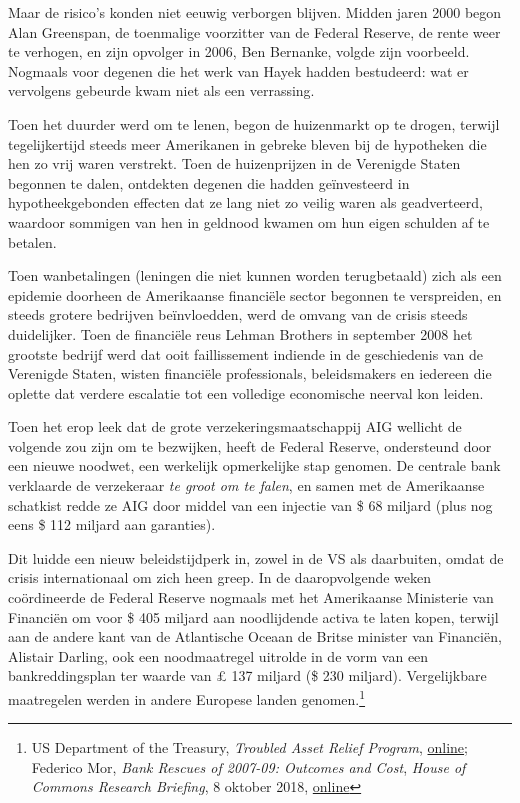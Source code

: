 \documentclass[
  a5paper,
  smalldemyvopaper,11pt,twoside,onecolumn,openright,extrafontsizes,
hidelinks]{memoir}
\begin{document}
Maar de risico's konden niet eeuwig verborgen blijven. Midden jaren 2000
begon Alan Greenspan, de toenmalige voorzitter van de Federal Reserve,
de rente weer te verhogen, en zijn opvolger in 2006, Ben Bernanke,
volgde zijn voorbeeld. Nogmaals voor degenen die het werk van Hayek
hadden bestudeerd: wat er vervolgens gebeurde kwam niet als een
verrassing.

Toen het duurder werd om te lenen, begon de huizenmarkt op te drogen,
terwijl tegelijkertijd steeds meer Amerikanen in gebreke bleven bij de
hypotheken die hen zo vrij waren verstrekt. Toen de huizenprijzen in de
Verenigde Staten begonnen te dalen, ontdekten degenen die hadden
geïnvesteerd in hypotheekgebonden effecten dat ze lang niet zo veilig
waren als geadverteerd, waardoor sommigen van hen in geldnood kwamen om
hun eigen schulden af te betalen.

Toen wanbetalingen (leningen die niet kunnen worden terugbetaald) zich
als een epidemie doorheen de Amerikaanse financiële sector begonnen te
verspreiden, en steeds grotere bedrijven beïnvloedden, werd de omvang
van de crisis steeds duidelijker. Toen de financiële reus Lehman
Brothers in september 2008 het grootste bedrijf werd dat ooit
faillissement indiende in de geschiedenis van de Verenigde Staten,
wisten financiële professionals, beleidsmakers en iedereen die oplette
dat verdere escalatie tot een volledige economische neerval kon leiden.

Toen het erop leek dat de grote verzekeringsmaatschappij AIG wellicht de
volgende zou zijn om te bezwijken, heeft de Federal Reserve, ondersteund
door een nieuwe noodwet, een werkelijk opmerkelijke stap genomen. De
centrale bank verklaarde de verzekeraar \emph{te groot om te falen}, en
samen met de Amerikaanse schatkist redde ze AIG door middel van een
injectie van \$ 68 miljard (plus nog eens \$ 112 miljard aan garanties).

Dit luidde een nieuw beleidstijdperk in, zowel in de VS als daarbuiten,
omdat de crisis internationaal om zich heen greep. In de daaropvolgende
weken coördineerde de Federal Reserve nogmaals met het Amerikaanse
Ministerie van Financiën om voor \$ 405 miljard aan noodlijdende activa
te laten kopen, terwijl aan de andere kant van de Atlantische Oceaan de
Britse minister van Financiën, Alistair Darling, ook een noodmaatregel
uitrolde in de vorm van een bankreddingsplan ter waarde van £ 137
miljard (\$ 230 miljard). Vergelijkbare maatregelen werden in andere
Europese landen genomen.\footnote{US Department of the Treasury,
  \emph{Troubled Asset Relief Program},
  \href{https://home.treasury.gov/data/troubled-asset-relief-program}{online};
  Federico Mor, \emph{Bank Rescues of 2007-09: Outcomes and Cost},
  \emph{House of Commons Research Briefing}, 8 oktober 2018,
  \href{https://commonslibrary.parliament.uk/research-briefings/sn05748/}{online}}
\end{document}
